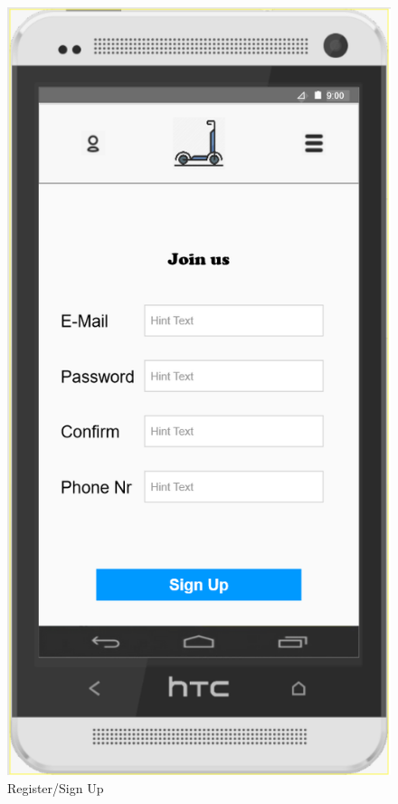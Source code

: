 \documentclass[a4paper, 12pt]{article}
\begin{document}
\begin{figure} [htbp]
  \begin{center}
    \includegraphics[scale=0.75]{images/prototypes/04-register-sign-up.png}
  \end{center}
  \caption{Register/Sign Up}
\end{figure}
\end{document}
